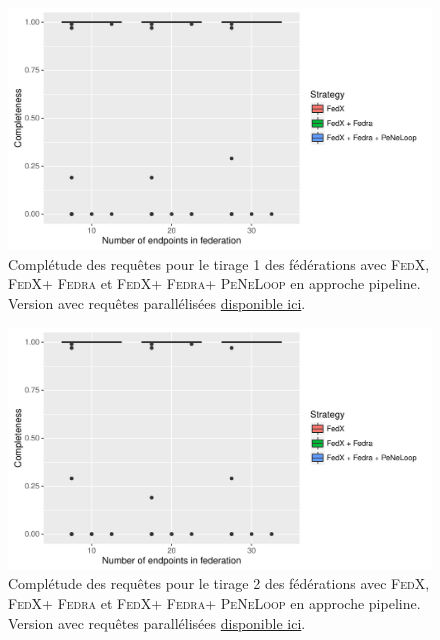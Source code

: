 \documentclass[a4paper]{article}
\def\fedra{\textsc{Fedra}\xspace}
\def\fedx{\textsc{FedX}\xspace}
\def\peneloop{\textsc{PeNeLoop}\xspace}
\newcommand{\parallelLink}[1]{Version avec requêtes parallélisées \href{#1}{disponible ici}.}
\begin{document}
\begin{figure}[h]
    \centering
    \includegraphics{boxplots/fed1_completeness.pdf}
    \caption{Complétude des requêtes pour le tirage 1 des fédérations avec \fedx, \fedx + \fedra et \fedx + \fedra + \peneloop en approche pipeline. \parallelLink{https://github.com/Callidon/ParallelNestedLoop/blob/master/results/definitive/fed1_pll_completeness.pdf}}
    \label{fig:fed1_compl}
\end{figure}

\begin{figure}[h]
    \centering
    \includegraphics{boxplots/fed2_completeness.pdf}
    \caption{Complétude des requêtes pour le tirage 2 des fédérations avec \fedx, \fedx + \fedra et \fedx + \fedra + \peneloop en approche pipeline. \parallelLink{https://github.com/Callidon/ParallelNestedLoop/blob/master/results/definitive/fed2_pll_completeness.pdf}}
    \label{fig:fed2_compl}
\end{figure}
\end{document}
